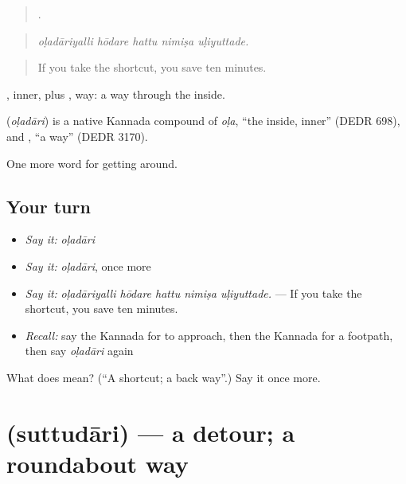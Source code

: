 \begin{quote}
    .
\end{quote}

\begin{quote}
\emph{oḷadāriyalli hōdare hattu nimiṣa uḷiyuttade.}
\end{quote}

\begin{quote}
If you take the shortcut, you save ten minutes.
\end{quote}

, inner, plus , way: a way through the inside.

\begin{cousinweb}
\textbf{} (\emph{oḷadāri}) is a native Kannada compound of \emph{oḷa}, \textquotedblleft{}the inside, inner\textquotedblright{} (DEDR 698), and , \textquotedblleft{}a way\textquotedblright{} (DEDR 3170).
\end{cousinweb}

\begin{grammarlens}[title={What you've built}]
One more word for getting around.
\end{grammarlens}

\subsection*{Your turn}
\begin{itemize}
\raggedright
  \item \emph{Say it:} \emph{oḷadāri}
  \item \emph{Say it:} \emph{oḷadāri}, once more
  \item \emph{Say it:} \emph{oḷadāriyalli hōdare hattu nimiṣa uḷiyuttade.} — If you take the shortcut, you save ten minutes.
  \item \emph{Recall:} say the Kannada for to approach, then the Kannada for a footpath, then say \emph{oḷadāri} again
\end{itemize}

\begin{tcolorbox}[breakable,colback=teal!4,colframe=teal!35!black,title={Before you move on}]
What does  mean? (\textquotedblleft{}A shortcut; a back way\textquotedblright{}.) Say it once more.
\end{tcolorbox}
\section[\texorpdfstring{\kn{ಸುತ್ತುದಾರಿ} (suttudāri)}{ಸುತ್ತುದಾರಿ (suttudāri)}]{ (suttudāri) — a detour; a roundabout way}

